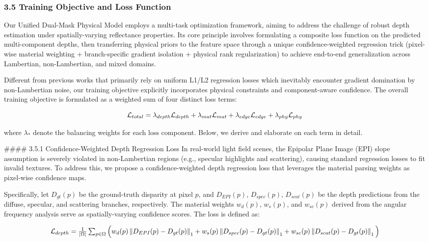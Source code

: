\documentclass[journal]{IEEEtran}
\begin{document}
\subsubsection{3.5 Training Objective and Loss Function}

Our Unified Dual-Mask Physical Model employs a multi-task optimization framework, aiming to address the challenge of robust depth estimation under spatially-varying reflectance properties. Its core principle involves formulating a composite loss function on the predicted multi-component depths, then transferring physical priors to the feature space through a unique confidence-weighted regression trick (pixel-wise material weighting + branch-specific gradient isolation + physical rank regularization) to achieve end-to-end generalization across Lambertian, non-Lambertian, and mixed domains. 

Different from previous works that primarily rely on uniform L1/L2 regression losses which inevitably encounter gradient domination by non-Lambertian noise, our training objective explicitly incorporates physical constraints and component-aware confidence. The overall training objective is formulated as a weighted sum of four distinct loss terms:

\[
$$ \mathcal{L}_{total} = \lambda_{depth} \mathcal{L}_{depth} + \lambda_{mat} \mathcal{L}_{mat} + \lambda_{edge} \mathcal{L}_{edge} + \lambda_{phy} \mathcal{L}_{phy} $$
\]

where $\lambda_{*}$ denote the balancing weights for each loss component. Below, we derive and elaborate on each term in detail.

\#\#\#\# 3.5.1 Confidence-Weighted Depth Regression Loss
In real-world light field scenes, the Epipolar Plane Image (EPI) slope assumption is severely violated in non-Lambertian regions (e.g., specular highlights and scattering), causing standard regression losses to fit invalid textures. To address this, we propose a confidence-weighted depth regression loss that leverages the material parsing weights as pixel-wise confidence maps. 

Specifically, let $D_{gt}(p)$ be the ground-truth disparity at pixel $p$, and $D_{EPI}(p)$, $D_{spec}(p)$, $D_{scat}(p)$ be the depth predictions from the diffuse, specular, and scattering branches, respectively. The material weights $w_d(p)$, $w_s(p)$, and $w_{sc}(p)$ derived from the angular frequency analysis serve as spatially-varying confidence scores. The loss is defined as:

\[
$$ \mathcal{L}_{depth} = \frac{1}{|\Omega|} \sum_{p \in \Omega} \Big( w_d(p) \left\| D_{EPI}(p) - D_{gt}(p) \right\|_1 + w_s(p) \left\| D_{spec}(p) - D_{gt}(p) \right\|_1 + w_{sc}(p) \left\| D_{scat}(p) - D_{gt}(p) \right\|_1 \Big) $$
\]
\end{document}
